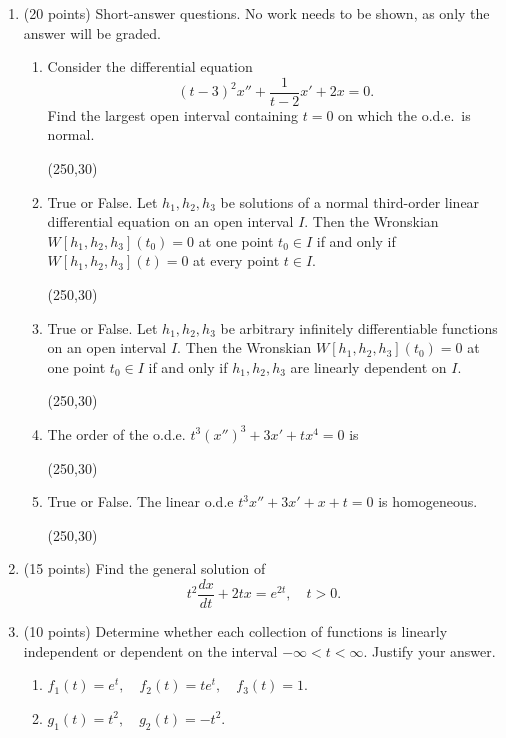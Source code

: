 \documentclass{article}
\begin{document}
\begin{enumerate}
 \setlength{\itemsep}{5mm}


\item (20 points) Short-answer questions.  No work needs to be shown, as only the answer will be graded.

  \begin{enumerate}
    \setlength{\itemsep}{5mm}


    \item Consider the differential equation
      \[
        (t-3)^2 x'' + \frac{1}{t-2} x' + 2x = 0.
        \]
        Find the largest open interval containing $t=0$ on which the
        o.d.e.\ is normal.
        
        \hfill \framebox(250,30){}

        \item  True or False.  Let $h_1, h_2, h_3$ be solutions of a normal
          third-order linear differential equation on an open
      interval $I$.  Then the Wronskian $W[h_1, h_2, h_3](t_0) = 0$
      at one point $t_0 \in I$ if and only if $W[h_1, h_2, h_3](t)
      =0$ at every point $t \in I$.

      \hfill \framebox(250,30){}

      \item True or False.  Let $h_1, h_2, h_3$ be arbitrary infinitely differentiable
        functions on an open interval $I$.  Then the Wronskian $W[h_1, h_2, h_3](t_0) = 0$
      at one point $t_0 \in I$ if and only if $h_1, h_2, h_3$
      are linearly dependent on $I$.

      \hfill \framebox(250,30){}

    \item The order of the o.d.e. $t^3 (x'')^3 + 3x' +tx^4 = 0$ is

      \hfill \framebox(250,30){}

        \item True or False.  The linear o.d.e $t^3 x'' + 3x' + x + t
          = 0$ is homogeneous.

          \hfill \framebox(250,30){}
\end{enumerate}
    
\newpage
  
\item (15 points) Find the general solution of
  \[
    t^2 \frac{dx}{dt} + 2tx = e^{2t}, \quad t >0.
  \]

  \item (10 points) Determine whether each collection of functions is linearly
    independent or dependent on the interval $-\infty < t < \infty$.
    Justify your answer.
    \begin{enumerate}
    \item $f_1(t) = e^t, \quad f_2(t) = t e^t, \quad f_3(t) = 1$.
    \item $g_1(t) = t^2, \quad g_2(t) = - t^2$.
      \end{enumerate}


\end{enumerate}
\end{document}

